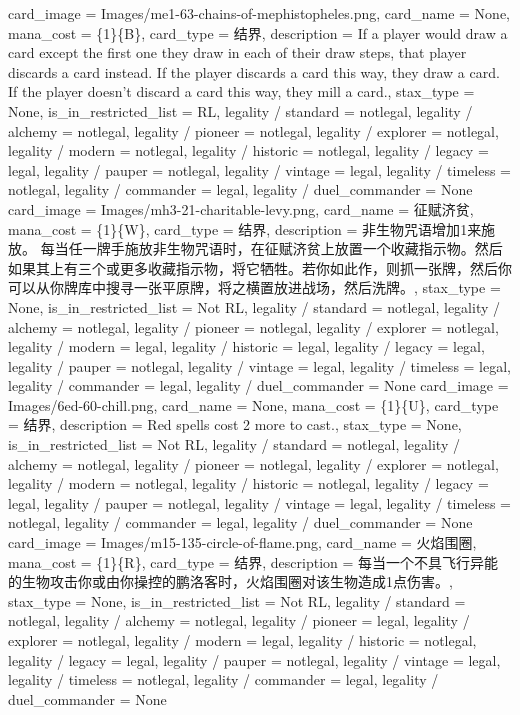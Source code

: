 \documentclass[lang = cn, color = black, 10pt]{AllThatStax}
\begin{document}
\card
{
	card_image = Images/me1-63-chains-of-mephistopheles.png,
	card_name = None,
	mana_cost = \{1\}\{B\},
	card_type = 结界,
	description = If a player would draw a card except the first one they draw in each of their draw steps, that player discards a card instead. If the player discards a card this way, they draw a card. If the player doesn't discard a card this way, they mill a card.,
	stax_type = None,
	is_in_restricted_list = RL,
	legality / standard = notlegal,
	legality / alchemy = notlegal,
	legality / pioneer = notlegal,
	legality / explorer = notlegal,
	legality / modern = notlegal,
	legality / historic = notlegal,
	legality / legacy = legal,
	legality / pauper = notlegal,
	legality / vintage = legal,
	legality / timeless = notlegal,
	legality / commander = legal,
	legality / duel_commander = None
}
\card
{
	card_image = Images/mh3-21-charitable-levy.png,
	card_name = 征赋济贫,
	mana_cost = \{1\}\{W\},
	card_type = 结界,
	description = 非生物咒语增加{1}来施放。
	每当任一牌手施放非生物咒语时，在征赋济贫上放置一个收藏指示物。然后如果其上有三个或更多收藏指示物，将它牺牲。若你如此作，则抓一张牌，然后你可以从你牌库中搜寻一张平原牌，将之横置放进战场，然后洗牌。,
	stax_type = None,
	is_in_restricted_list = Not RL,
	legality / standard = notlegal,
	legality / alchemy = notlegal,
	legality / pioneer = notlegal,
	legality / explorer = notlegal,
	legality / modern = legal,
	legality / historic = legal,
	legality / legacy = legal,
	legality / pauper = notlegal,
	legality / vintage = legal,
	legality / timeless = legal,
	legality / commander = legal,
	legality / duel_commander = None
}
\card
{
	card_image = Images/6ed-60-chill.png,
	card_name = None,
	mana_cost = \{1\}\{U\},
	card_type = 结界,
	description = Red spells cost {2} more to cast.,
	stax_type = None,
	is_in_restricted_list = Not RL,
	legality / standard = notlegal,
	legality / alchemy = notlegal,
	legality / pioneer = notlegal,
	legality / explorer = notlegal,
	legality / modern = notlegal,
	legality / historic = notlegal,
	legality / legacy = legal,
	legality / pauper = notlegal,
	legality / vintage = legal,
	legality / timeless = notlegal,
	legality / commander = legal,
	legality / duel_commander = None
}
\card
{
	card_image = Images/m15-135-circle-of-flame.png,
	card_name = 火焰围圈,
	mana_cost = \{1\}\{R\},
	card_type = 结界,
	description = 每当一个不具飞行异能的生物攻击你或由你操控的鹏洛客时，火焰围圈对该生物造成1点伤害。,
	stax_type = None,
	is_in_restricted_list = Not RL,
	legality / standard = notlegal,
	legality / alchemy = notlegal,
	legality / pioneer = legal,
	legality / explorer = notlegal,
	legality / modern = legal,
	legality / historic = notlegal,
	legality / legacy = legal,
	legality / pauper = notlegal,
	legality / vintage = legal,
	legality / timeless = notlegal,
	legality / commander = legal,
	legality / duel_commander = None
}
\end{document}
